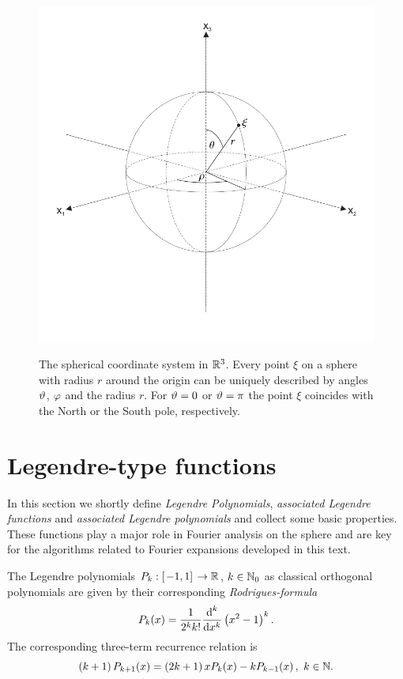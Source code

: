\begin{figure}[htb]
  \centering
  \includegraphics[height=12cm,width=12cm]{images/sphere}
  \caption{The spherical coordinate system in $\mathbb{R}^3$. Every point $\xi$ on a
  sphere with radius $r$ around the origin can be uniquely described by angles 
  $\vartheta$, $\varphi$ and the radius $r$. For $\vartheta = 0$ or
  $\vartheta = \pi$ the point $\xi$ coincides with the North or the South
  pole, respectively.}
  \label{sphere}
\end{figure}

\section{Legendre-type functions}
\label{Basics:LegendreTypeFunctions}
In this section we shortly define \emph{Legendre Polynomials}, \emph{associated Legendre functions} 
and \emph{associated Legendre polynomials} and collect some basic properties. These functions play 
a major role in Fourier analysis on the sphere and are key for the algorithms related to Fourier 
expansions developed in this text.

The Legendre polynomials $P_k : \left[\left.-1,1\right]\right. \rightarrow \mathbb{R}$, $k \in \mathbb{N}_{0}$ 
as classical orthogonal polynomials are given by their corresponding 
\emph{Rodrigues-formula}
\begin{equation}
  \nonumber
  P_k{\hspace{-0.4ex}}\left(x\right) = \frac{1}{2^k k!} \frac{\text{\rm{d}}^k}{\text{\rm{d}} x^k} \left(x^2-1\right)^k.
\end{equation}
The corresponding three-term recurrence relation is
\begin{equation}
  \nonumber
  \left(k+1\right)P_{k+1}{\hspace{-0.4ex}}\left(x\right) = \left(2k+1\right)xP_{k}{\hspace{-0.4ex}}\left(x\right) -
  kP_{k-1}{\hspace{-0.4ex}}\left(x\right),\ k \in \mathbb{N}.
\end{equation}

